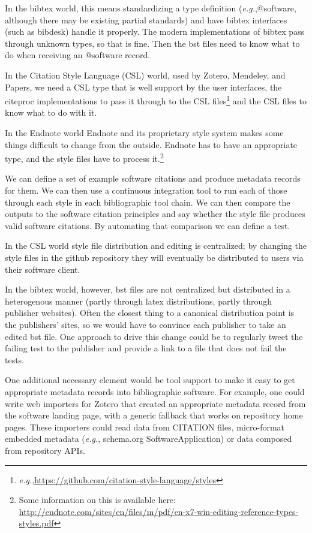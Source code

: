 \documentclass[a4paper,UKenglish]{dagman}
\newcommand{\eg}{\emph{e.g.},\xspace}
\begin{document}
In the bibtex world, this means standardizing a type definition (\eg @software, although there may be existing partial standards) and have bibtex interfaces (such as bibdesk) handle it properly. The modern implementations of bibtex pass through unknown types, so that is fine. Then the bst files need to know what to do when receiving an @software record.

In the Citation Style Language (CSL) world, used by Zotero, Mendeley, and Papers, we need a CSL type that is well support by the user interfaces, the citeproc implementations to pass it through to the CSL files\footnote{\eg \url{https://github.com/citation-style-language/styles}} and the CSL files to know what to do with it.

In the Endnote world Endnote and its proprietary style system makes some things difficult to change from the outside. Endnote has to have an appropriate type, and the style files have to process it.\footnote{Some information on this is available here:\\ \url{http://endnote.com/sites/en/files/m/pdf/en-x7-win-editing-reference-types-styles.pdf}}

We can define a set of example software citations and produce metadata records for them. We can then use a continuous integration tool to run each of those through each style in each bibliographic tool chain. We can then compare the outputs to the software citation principles and say whether the style file produces valid software citations. By automating that comparison we can define a test.

In the CSL world style file distribution and editing is centralized; by changing the style files in the github repository they will eventually be distributed to users via their software client.

In the bibtex world, however, bst files are not centralized but distributed in a heterogenous manner (partly through latex distributions, partly through publisher websites). Often the closest thing to a canonical distribution point is the publishers' sites, so we would have to convince each publisher to take an edited bst file.  One approach to drive this change could be to regularly tweet the failing test to the publisher and provide a link to a file that does not fail the tests.

One additional necessary element would be tool support to make it easy to get appropriate metadata records into bibliographic software. For example, one could write web importers for Zotero that created an appropriate metadata record from the software landing page, with a generic fallback that works on repository home pages. These importers could read data from CITATION files, micro-format embedded metadata (\eg schema.org SoftwareApplication) or data composed from repository APIs.
\end{document}
